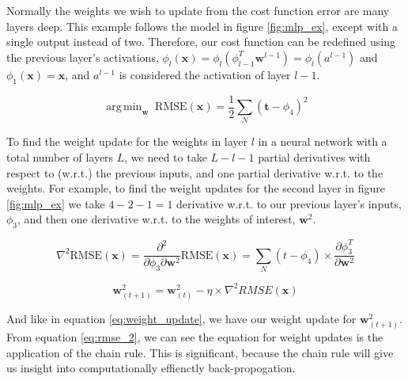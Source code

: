 \documentclass[11pt]{article}
\DeclareMathOperator*{\argmin}{arg\,min}
\begin{document}
Normally the weights we wish to update from the cost function error are many layers deep. This example follows the model in figure \ref{fig:mlp_ex}, except with a single output instead of two. Therefore, our cost function can be redefined using the previous layer's activations, $\phi_{l}(\mathbf{x}) = \phi_{l}\left(\phi_{l-1}^{T}\mathbf{w}^{l-1}\right) = \phi_{l}\left(a^{l-1}\right)$ and $\phi_{1}(\mathbf{x}) = \mathbf{x}$, and $a^{l-1}$ is considered the activation of layer $l-1$. 

\begin{equation}
    \argmin_{\mathbf{w}} \;\mathrm{RMSE}(\mathbf{x}) = \frac{1}{2}\sum_{N} \left(\mathbf{t} - \phi_{4}\right)^{2}
\end{equation}


\par
To find the weight update for the weights in layer $l$ in a neural network with a total number of layers $L$, we need to take $L - l - 1$ partial derivatives with respect to (w.r.t.) the previous inputs, and one partial derivative w.r.t. to the weights. 
For example, to find the weight updates for the second layer in figure \ref{fig:mlp_ex} we take $4 - 2 - 1 = 1$ derivative w.r.t. to our previous layer's inputs, $\phi_{3}$, and then one derivative w.r.t. to the weights of interest, $\mathbf{w}^{2}$.

\begin{equation}\label{eq:rmse_2}
  \nabla^{2}\mathrm{RMSE}(\mathbf{x}) = \frac{\partial^{2}}{\partial \phi_{3} \partial \mathbf{w}^{2}}\mathrm{RMSE}(\mathbf{x}) = \sum_{N}\left(t - \phi_{4}\right) \times \frac{\partial \phi^{T}_{3}}{\partial \mathbf{w}^{2}}
\end{equation}


\[
  \mathbf{w}_{(t+1)}^{2} = \mathbf{w}_{(t)}^{2} - \eta \times \nabla^{2} RMSE(\mathbf{x})
\]

And like in equation \ref{eq:weight_update}, we have our weight update for $\mathbf{w}^{2}_{(t+1)}$. From equation \ref{eq:rmse_2}, we can see the equation for weight updates is the application of the chain rule. This is significant, because the chain rule will give us insight into computationally effienctly back-propogation.

\newcommand\xbase{-3.95}
\newcommand\ybase{0.7}
\newcommand\hibox{1.2}
\newcommand\wibox{0.88}
\newcommand\tbdis{3.34}
\newcommand\bbdis{3.34}
\newcommand\ybshift{-1.275}
\newcommand\xbshift{-0.45}
\newcommand\xobshift{1.35}
\newcommand\xotshift{1.85}
\end{document}
